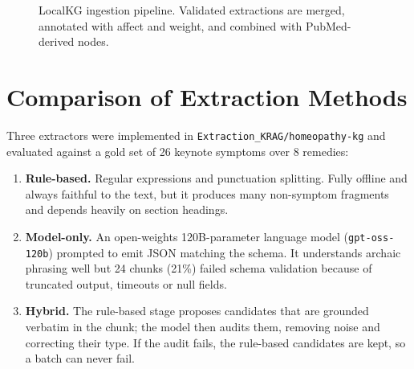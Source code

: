 \documentclass[12pt,a4paper,oneside]{report}
\newcommand{\code}[1]{\texttt{\small #1}}
\begin{document}
\begin{figure}[H]
\centering
{}
\caption{LocalKG ingestion pipeline. Validated extractions are merged, annotated with affect and weight, and combined with PubMed-derived nodes.}
\label{fig:extract}
\end{figure}

\section{Comparison of Extraction Methods}\label{sec:extraction}
Three extractors were implemented in \code{Extraction\_KRAG/homeopathy-kg} and evaluated against a gold set of 26 keynote symptoms over 8 remedies:
\begin{enumerate}
  \item \textbf{Rule-based.} Regular expressions and punctuation splitting. Fully offline and always faithful to the text, but it produces many non-symptom fragments and depends heavily on section headings.
  \item \textbf{Model-only.} An open-weights 120B-parameter language model (\code{gpt-oss-120b}) prompted to emit JSON matching the schema. It understands archaic phrasing well but 24 chunks (21\%) failed schema validation because of truncated output, timeouts or null fields.
  \item \textbf{Hybrid.} The rule-based stage proposes candidates that are grounded verbatim in the chunk; the model then audits them, removing noise and correcting their type. If the audit fails, the rule-based candidates are kept, so a batch can never fail.
\end{enumerate}
\end{document}
